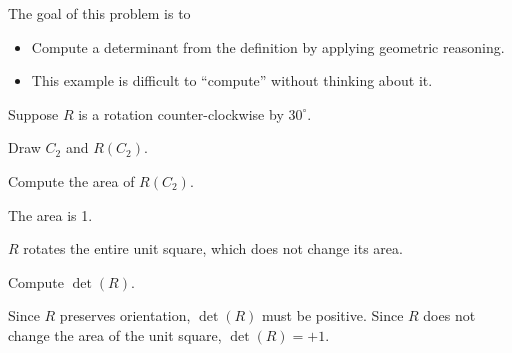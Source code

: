 \documentclass{workbook}
\begin{document}
\begin{slide}
	\question
	\begin{annotation}
		\begin{goals}

			The goal of this problem is to
			\begin{itemize}
				\item Compute a determinant from the definition by applying geometric reasoning.
			\end{itemize}
		\end{goals}

		\begin{notes}
			\begin{itemize}
				\item This example is difficult to ``compute'' without thinking about it.
			\end{itemize}
		\end{notes}
	\end{annotation}
	Suppose $R$ is a rotation counter-clockwise by $30^\circ$.
	\begin{parts}
		\item Draw $C_2$ and $R(C_2)$.
			\begin{solution}
			\end{solution}
		\item Compute the area of $R(C_2)$.
			\begin{solution}
				The area is 1.

				$R$ rotates the entire unit square, which does not change its area.
			\end{solution}
		\item Compute $\det(R)$.
			\begin{solution}
				Since $R$ preserves orientation, $\det(R)$ must be positive.
				Since $R$ does not change the area of the unit square, $\det(R)=+1$.
			\end{solution}
	\end{parts}
\end{slide}
\end{document}
